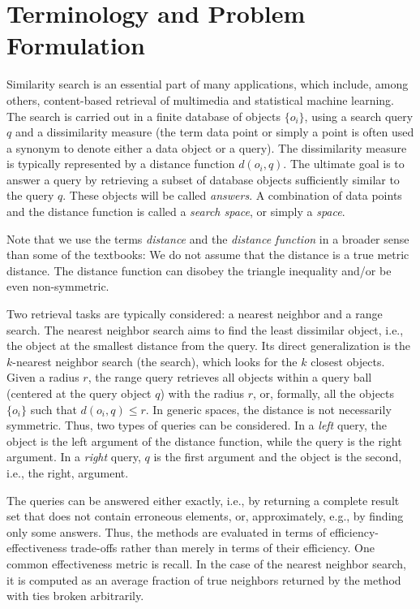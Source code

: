 \section{Terminology and Problem Formulation}\label{SectionProbForm}
Similarity search is an essential part of many applications,
which include, among others,  
content-based retrieval of multimedia  and statistical machine learning.
The search is carried out in a finite database of objects $\{o_i\}$,
using a search query $q$ and a dissimilarity measure (the term data point or simply a point is often
used a synonym to denote either a data object or a query).
 The dissimilarity measure is typically represented by a distance function $d(o_i, q)$. 
The ultimate goal is to answer a query by retrieving a subset of database objects sufficiently similar to the query $q$.
These objects will be called \emph{answers}.
A combination of data points and the distance function is called a \emph{search space},
or simply a \emph{space}.


Note that we use the terms \emph{distance} and the \emph{distance function} in a broader sense than
some of the textbooks:
We do not assume that the distance is a true metric distance. 
The distance function can disobey the triangle inequality and/or be even non-symmetric.

Two retrieval tasks are typically considered: a nearest neighbor and a range search. 
The nearest neighbor search aims to find the least dissimilar object,
i.e., the object at the smallest distance from the query.
Its direct generalization is the $k$-nearest neighbor search (the \knn search),
which looks for the $k$  closest objects.
Given a radius $r$, 
the range query retrieves all objects within a query ball (centered at the query object $q$) with the radius $r$,
or, formally, all the objects~$\lbrace o_i \rbrace$ such that $d(o_i, q) \le r$. 
In generic spaces, the distance is not necessarily symmetric. 
Thus, two types of queries can be considered. 
In a  \emph{left} query, the object is the left argument of the distance function,
while the query is the right argument.
In a \emph{right} query, $q$ is the first argument and the object is the second, i.e.,
the right, argument.

The queries can be answered either exactly, 
i.e., by returning a complete result set that does not contain erroneous elements, or, 
approximately, e.g., by finding only some answers.
Thus, the methods are evaluated in terms of efficiency-effectiveness trade-offs
rather than merely in terms of their efficiency.
One common effectiveness metric is recall. In the case
of the nearest neighbor search, it is computed as
an average fraction of true neighbors returned by the method with ties broken arbitrarily.
